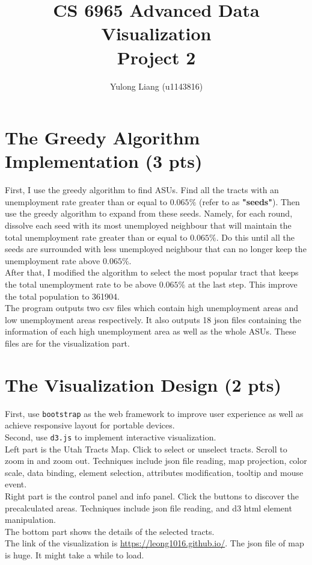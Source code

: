 \documentclass[12pt]{article}
\begin{document}
\title{CS 6965 Advanced Data Visualization\\{\bf Project 2}}
\author{Yulong Liang (u1143816)}
\maketitle

\section{The Greedy Algorithm Implementation (3 pts)}
First, I use the greedy algorithm to find ASUs. Find all the tracts with an unemployment rate greater than or equal to $0.065\%$ (refer to as \textbf{"seeds"}). Then use the greedy algorithm to expand from these seeds. Namely, for each round, dissolve each seed with its most unemployed neighbour that will maintain the total unemployment rate greater than or equal to $0.065\%$. Do this until all the seeds are surrounded with less unemployed neighbour that can no longer keep the unemployment rate above $0.065\%$.\\

After that, I modified the algorithm to select the most popular tract that keeps the total unemployment rate to be above $0.065\%$ at the last step. This improve the total population to 361904.\\

The program outputs two csv files which contain high unemployment areas and low unemployment areas respectively. It also outputs 18 json files containing the information of each high unemployment area as well as the whole ASUs. These files are for the visualization part. 

\section{The Visualization Design (2 pts)}
First, use \texttt{bootstrap} as the web framework to improve user experience as well as achieve responsive layout for portable devices.\\
Second, use \texttt{d3.js} to implement interactive visualization. \\

Left part is the Utah Tracts Map. Click to select or unselect tracts. Scroll to zoom in and zoom out. Techniques include json file reading, map projection, color scale, data binding, element selection, attributes modification, tooltip and mouse event.\\
Right part is the control panel and info panel. Click the buttons to discover the precalculated areas. Techniques include json file reading, and d3 html element manipulation.\\
The bottom part shows the details of the selected tracts.\\

The link of the visualization is \url{https://leong1016.github.io/}. The json file of map is huge. It might take a while to load.
\end{document}
